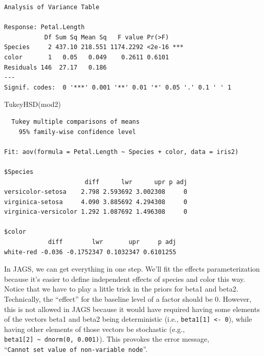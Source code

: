 \documentclass[
  13,
  letterpaper,
]{report}
\newenvironment{Shaded}{\begin{snugshade}}{\end{snugshade}}
\newcommand{\AttributeTok}[1]{\textcolor[rgb]{0.40,0.45,0.13}{#1}}
\newcommand{\CommentTok}[1]{\textcolor[rgb]{0.37,0.37,0.37}{#1}}
\newcommand{\FunctionTok}[1]{\textcolor[rgb]{0.28,0.35,0.67}{#1}}
\newcommand{\NormalTok}[1]{\textcolor[rgb]{0.00,0.23,0.31}{#1}}
\newcommand{\OtherTok}[1]{\textcolor[rgb]{0.00,0.23,0.31}{#1}}
\newcommand{\SpecialCharTok}[1]{\textcolor[rgb]{0.37,0.37,0.37}{#1}}
\newcommand{\StringTok}[1]{\textcolor[rgb]{0.13,0.47,0.30}{#1}}
\begin{document}
\begin{Shaded}
\end{Shaded}

\begin{verbatim}
Analysis of Variance Table

Response: Petal.Length
           Df Sum Sq Mean Sq   F value Pr(>F)    
Species     2 437.10 218.551 1174.2292 <2e-16 ***
color       1   0.05   0.049    0.2611 0.6101    
Residuals 146  27.17   0.186                     
---
Signif. codes:  0 '***' 0.001 '**' 0.01 '*' 0.05 '.' 0.1 ' ' 1
\end{verbatim}

\begin{Shaded}
\begin{Highlighting}[]
\FunctionTok{TukeyHSD}\NormalTok{(mod2)}
\end{Highlighting}
\end{Shaded}

\begin{verbatim}
  Tukey multiple comparisons of means
    95% family-wise confidence level

Fit: aov(formula = Petal.Length ~ Species + color, data = iris2)

$Species
                      diff      lwr      upr p adj
versicolor-setosa    2.798 2.593692 3.002308     0
virginica-setosa     4.090 3.885692 4.294308     0
virginica-versicolor 1.292 1.087692 1.496308     0

$color
            diff        lwr       upr     p adj
white-red -0.036 -0.1752347 0.1032347 0.6101255
\end{verbatim}

In JAGS, we can get everything in one step. We'll fit the effects
parameterization because it's easier to define independent effects of
species and color this way. Notice that we have to play a little trick
in the priors for beta1 and beta2. Technically, the ``effect'' for the
baseline level of a factor should be 0. However, this is not allowed in
JAGS because it would have required having some elements of the vectors
beta1 and beta2 being deterministic (i.e.,
\texttt{beta1{[}1{]}\ \textless{}-\ 0}), while having other elements of
those vectors be stochastic (e.g.,
\texttt{beta1{[}2{]}\ \textasciitilde{}\ dnorm(0,\ 0.001)}). This
provokes the error message,
``\texttt{Cannot\ set\ value\ of\ non-variable\ node}''.
\end{document}
